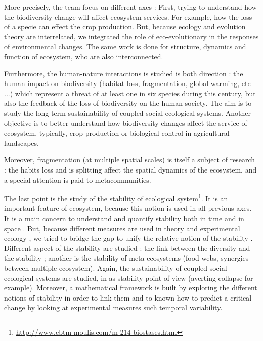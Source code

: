 \documentclass{article}
\begin{document}
More precisely, the team focus on different axes : First,  trying to understand how the biodiversity change will affect ecosystem services. For example, how the loss of a specie can effect the crop production. But, because ecology and evolution theory are interrelated, we integrated the role of eco-evolutionary in the responses of environmental changes. The same work is done for structure, dynamics and function of ecosystem, who are also interconnected. \cite{bastazini2019loss}\cite{bideault2019temperature}\cite{galiana2019geographical}


Furthermore, the human-nature interactions is studied is both direction : the human impact on biodiversity (habitat loss, fragmentation, global warming, etc ...) which represent a threat of at least one in six species during this century, but also the feedback of the loss of biodiversity on the human society. The aim is to study the long term sustainability of coupled social-ecological systems. Another objective is to better understand how biodiversity changes affect the service of ecosystem, typically, crop production or biological control in agricultural landscapes.
\cite{cazalis2018we}\cite{lafuite2018sustainable}\cite{montoya2018trade}\cite{montoya2019trade}

Moreover, fragmentation (at multiple spatial scales) is itself a subject of research : the habits loss and is splitting affect the spatial dynamics of the ecosystem, and a special attention is paid to metacommunities. \cite{goncalves2018habitat}\cite{jacob2018habitat}

The last point is the study of the stability of ecological system\footnote{\url{http://www.cbtm-moulis.com/m-214-biostases.html}}. It is an important feature of ecosystem, because this notion is used in all previous axes. It is a main concern to understand and quantify stability both in time and in space \cite{wang2017invariability}\cite{zelnik2018impact}. But, because different measures are used in theory and experimental ecology , we tried to bridge the gap to unify the relative notion of the stability \cite{arnoldi2018ecosystems}\cite{barbier2019pyramids}.
Different aspect of the stability are studied : the link between the diversity and the stability \cite{vallina2017phytoplankton} ; another is the stability of meta-ecosystems (food webs, synergies between multiple ecosystem)\cite{arnoldi2016particularity}\cite{lurgi2016effects}\cite{wang2016biodiversity}. Again, the sustainability of coupled social–ecological systems are studied, in as stability point of view (averting collapse for example). Moreover, a mathematical framework is built by exploring the different notions of stability in order to link them \cite{arnoldi2018ecosystems}\cite{arnoldi2016unifying}\cite{donohue2016navigating} and to known how to predict a critical change by looking at experimental measures such temporal variability\cite{arnoldi2016resilience}\cite{haegeman2016resilience}\cite{wang2017invariability}. 
\end{document}

